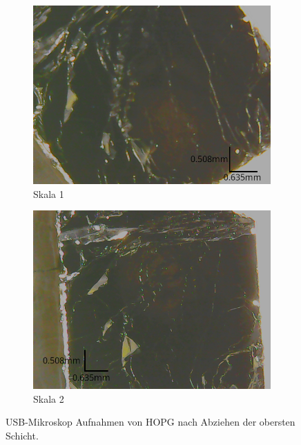 \begin{figure}[htb]
	\centering
	\begin{subfigure}{0.45\linewidth}
		\centering
		\includegraphics[width=\linewidth]{figs/hopg_skala1.png}
		\caption{Skala 1}
		\label{fig:hopg_skala1}
	\end{subfigure}
	\hspace{0.5cm}
	\begin{subfigure}{0.45\linewidth}
		\centering
		\includegraphics[width=\linewidth]{figs/hopg_skala2.png}
		\caption{Skala 2}
		\label{fig:hopg_skala2}
	\end{subfigure}
	\caption{USB-Mikroskop Aufnahmen von HOPG nach Abziehen der obersten Schicht.}
	\label{fig:usb_mikroskop_hopg}
\end{figure}

